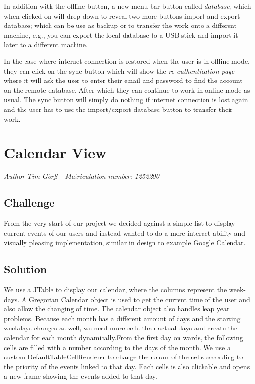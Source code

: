 In addition with the offline button, a new menu bar button called \emph{database}, which when clicked on 
will drop down to reveal two more buttons import and export database; which can be use as backup or to transfer the work onto a different
machine, e.g., you can export the local database to a USB stick and import it later to a different machine.

In the case where internet connection is restored when the user is in offline mode, they can click on the sync 
button which will show the \emph{re-authentication page} where it will ask the user to enter their email and
password to find the account on the remote database. After which they can continue to work in online mode as
usual. The sync button will simply do nothing if internet connection is lost again and the user has to
use the import/export database button to transfer their work. 

\section{Calendar View}
\emph{Author Tim Görß - Matriculation number: 1252200}

\subsection{Challenge}
From the very start of our project we decided against a simple list to display current events of our
users and instead wanted to do a more interact ability and visually pleasing implementation, similar in design to example Google Calendar.


\subsection{Solution}
We use a JTable to display our calendar, where the columns represent the week-days. A Gregorian Calendar object is used to get
the current time of the user and also allow the changing of time. The calendar object also handles leap year problems.
Because each month has a different amount of days and the starting weekdays changes as well, we need more cells than actual days
and create the calendar for each month dynamically.From the first day on wards, the following cells are filled 
with a number according to the days of the month. We use a custom DefaultTableCellRenderer to change the colour of the cells
according to the priority of the events linked to that day. Each cells is also clickable and opens a new frame showing the events
added to that day.

